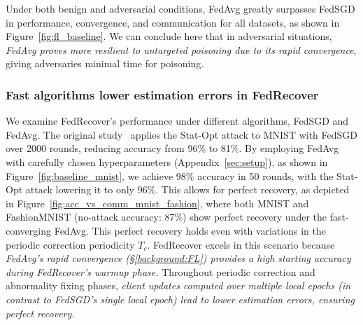 Under both benign and adversarial conditions, FedAvg greatly surpasses FedSGD in performance, convergence, and communication for all datasets, as shown in Figure~\ref{fig:fl_baseline}. 
We can conclude here that in adversarial situations, \emph{FedAvg proves more resilient to untargeted poisoning due to its rapid convergence}, giving adversaries minimal time for poisoning.
\subsubsection{Fast algorithms lower estimation errors in FedRecover}\label{impact:algorithm:fdr}
We examine FedRecover's performance under different algorithms, FedSGD and FedAvg. The original study~\cite{cao2022fedrecover} applies the Stat-Opt attack to MNIST with FedSGD over 2000 rounds, reducing accuracy from 96\% to 81\%. By employing FedAvg with carefully chosen hyperparameters (Appendix~\ref{sec:setup}), as shown in Figure~\ref{fig:baseline_mnist}, we achieve 98\% accuracy in 50 rounds, with the Stat-Opt attack lowering it to only 96\%. This allows for perfect recovery, as depicted in Figure~\ref{fig:acc_vs_comm_mnist_fashion}, where both MNIST and FashionMNIST (no-attack accuracy: 87\%) show perfect recovery under the fast-converging FedAvg. This perfect recovery holds even with variations in the periodic correction periodicity $T_c$.
FedRecover excels in this scenario because \emph{FedAvg's rapid convergence (\S\ref{background:FL}) provides a high starting accuracy during FedRecover's \emph{warmup phase}.} Throughout periodic correction and abnormality fixing phases, \emph{client updates computed over multiple local epochs (in contrast to FedSGD's single local epoch) lead to lower estimation errors, ensuring perfect recovery.}
